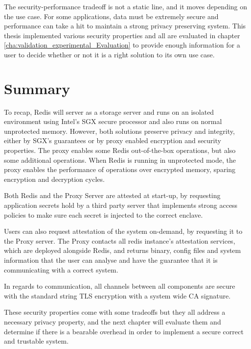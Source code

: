 The security-performance tradeoff is not a static line, and it moves depending on the use case. For some applications, data must be extremely secure and performance can take a hit to maintain a strong privacy preserving system. This thesis implemented various security properties and all are evaluated in chapter \ref{cha:validation_experimental_Evaluation} to provide enough information for a user to decide whether or not it is a right solution to its own use case.


\section{Summary}
\label{sec:chapter4_summary}

To recap, Redis will server as a storage server and runs on an isolated environment using Intel's \gls{SGX} secure processor and also runs on normal unprotected memory. However, both solutions preserve privacy and integrity, either by \gls{SGX}'s guarantees or by proxy enabled encryption and security properties. The proxy enables some Redis out-of-the-box operations, but also some additional operations. When Redis is running in unprotected mode, the proxy enables the performance of operations over encrypted memory, sparing encryption and decryption cycles.

Both Redis and the Proxy Server are attested at start-up, by requesting application secrets hold by a third party server that implements strong access policies to make sure each secret is injected to the correct enclave. 

Users can also request attestation of the system on-demand, by requesting it to the Proxy server. The Proxy contacts all redis instance's attestation services, which are deployed alongside Redis, and returns binary, config files and system information that the user can analyse and have the guarantee that it is communicating with a correct system.

In regards to communication, all channels between all components are secure with the standard string TLS encryption with a system wide CA signature.

These security properties come with some tradeoffs but they all address a necessary privacy property, and the next chapter will evaluate them and determine if there is a bearable overhead in order to implement a secure correct and trustable system.
